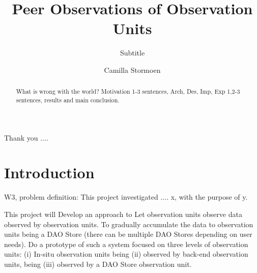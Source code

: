 \documentclass[USenglish]{uit-thesis}
\begin{document}

\title{Peer Observations of Observation Units}
\subtitle{Subtitle}			%
\author{Camilla Stormoen}

\maketitle

\frontmatter



\begin{epigraph}
\end{epigraph}


\begin{abstract}
What is wrong with the world? Motivation 1-3 sentences, Arch, Des, Imp, Exp 1,2-3 sentences, results and main conclusion.
\end{abstract}

\begin{acknowledgement}
Thank you ....
\end{acknowledgement}

\tableofcontents

\listofdefinition

\mainmatter

\chapter{Introduction}
W3, problem definition: This project investigated .... x, with the purpose of y.


This project will 
Develop an approach to 
Let observation units observe data observed by observation units. 
To gradually accumulate the data to observation units being a DAO Store (there can be multiple DAO Stores depending on user needs).
Do a prototype of such a system focused on three levels of observation units: (i) In-situ observation units being (ii) observed by back-end observation units, being (iii) observed by a DAO Store observation unit.
\end{document}
